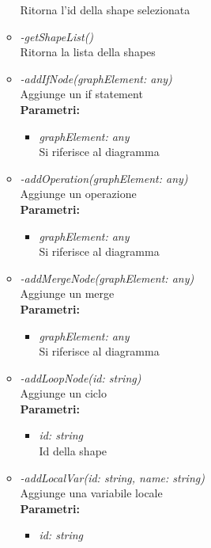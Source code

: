 \begin{itemize}
\begin{itemize}
    		Ritorna l'id della shape selezionata
    		\item \emph{-getShapeList()}\\
    		Ritorna la lista della shapes
    		\item \emph{-addIfNode(graphElement: any)}\\
    		Aggiunge un if statement\\
    		\textbf{Parametri:}
    		\begin{itemize}
    			\item \emph{graphElement: any}\\
    			Si riferisce al diagramma
    		\end{itemize}
    		\item \emph{-addOperation(graphElement: any)}\\
    		Aggiunge un operazione\\
    		\textbf{Parametri:}
    		\begin{itemize}
    			\item \emph{graphElement: any}\\
    			Si riferisce al diagramma
    		\end{itemize}
    		\item \emph{-addMergeNode(graphElement: any)}\\
    		Aggiunge un merge\\
    		\textbf{Parametri:}
    		\begin{itemize}
    			\item \emph{graphElement: any}\\
    			Si riferisce al diagramma
    		\end{itemize}
    		\item \emph{-addLoopNode(id: string)}\\
    		Aggiunge un ciclo\\
    		\textbf{Parametri:}
    		\begin{itemize}
    			\item \emph{id: string}\\
    			Id della shape
    		\end{itemize}
    		\item \emph{-addLocalVar(id: string, name: string)}\\
    		Aggiunge una variabile locale\\
    		\textbf{Parametri:}
    		\begin{itemize}
    			\item \emph{id: string}\\

\end{itemize}
\end{itemize}
\end{itemize}
